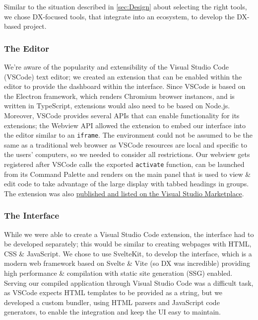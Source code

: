 \documentclass[../mpaper.tex]{subfiles}
\begin{document}
Similar to the situation described in \autoref{sec:Design} about selecting the right tools, we chose DX-focused tools, that integrate into an ecosystem, to develop the DX-based project. %

\subsubsection*{The Editor} %

We're aware of the popularity and extensibility of the Visual Studio Code (VSCode) text editor; we created an extension that can be enabled within the editor to provide the dashboard within the interface. Since VSCode is based on the Electron framework, which renders Chromium browser instances, and is written in TypeScript, extensions would also need to be based on Node.js. Moreover, VSCode provides several APIs that can enable functionality for its extensions; the Webview API allowed the extension to embed our interface into the editor similar to an \texttt{iframe}. The environment could not be assumed to be the same as a traditional web browser as VSCode resources are local and specific to the users' computers, so we needed to consider all restrictions. Our webview gets registered after VSCode calls the exported \texttt{activate} function, can be launched from its Command Palette and renders on the main panel that is used to view \& edit code to take advantage of the large display with tabbed headings in groups. The extension was also \href{https://marketplace.visualstudio.com/items?itemName=2504266b-student-gla-ac-uk.code-fitness}{published and listed on the Visual Studio Marketplace}.

\subsubsection*{The Interface} %

While we were able to create a Visual Studio Code extension, the interface had to be developed separately; this would be similar to creating webpages with HTML, CSS \& JavaScript. We chose to use SvelteKit, to develop the interface, which is a modern web framework based on Svelte \& Vite (so DX was incredible) providing high performance \& compilation with static site generation (SSG) enabled. Serving our compiled application through Visual Studio Code was a difficult task, as VSCode expects HTML templates to be provided as a string, but we developed a custom bundler, using HTML parsers and JavaScript code generators, to enable the integration and keep the UI easy to maintain.
\end{document}
